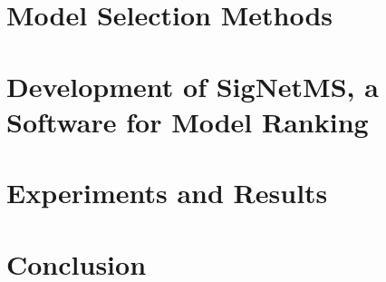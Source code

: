 \documentclass[12pt, twoside]{report}
\numberwithin{mydefinition}{section}
\numberwithin{mytheorem}{section}
\numberwithin{mylemma}{section}
\numberwithin{corollary}{section}
\begin{document}
\chapter{Model Selection Methods}
\label{chap:model_selection}


\chapter{Development of SigNetMS, a Software for Model Ranking}
\label{chap:development_signetms}


\chapter{Experiments and Results}
\label{chap:experiments}


\chapter{Conclusion}
\label{chap:conclusion}


\newpage
\printbibliography
\end{document}
